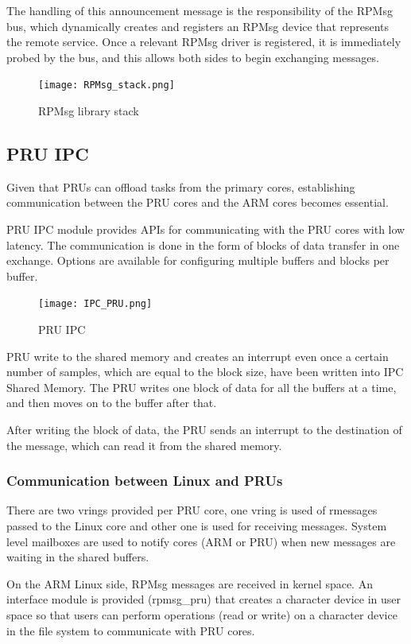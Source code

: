 The handling of this announcement message is the responsibility of the
RPMsg bus, which dynamically creates and registers an RPMsg device that
represents the remote service. Once a relevant RPMsg driver is registered, it
is immediately probed by the bus, and this allows both sides to begin
exchanging messages.

\begin{figure}[ht]
    \centering
    \texttt{[image: RPMsg\_stack.png]}
    \caption{RPMsg library stack}
\end{figure}

\subsection{PRU IPC}

Given that PRUs can offload tasks from the primary cores, establishing 
communication between the PRU cores and the ARM cores becomes essential.

PRU IPC module provides APIs for communicating with the PRU cores with low
latency. The communication is done in the form of blocks of data transfer in
one exchange. Options are available for configuring multiple buffers and blocks
per buffer.

\begin{figure}[ht]
    \centering
    \texttt{[image: IPC\_PRU.png]}
    \caption{PRU IPC}
\end{figure}

PRU write to the shared memory and creates an interrupt even once a certain
number of samples, which are equal to the block size, have been written into
IPC Shared Memory.
The PRU writes one block of data for all the buffers at a time, and then moves
on to the buffer after that.

After writing the block of data, the PRU sends an interrupt to the destination
of the message, which can read it from the shared memory.

\subsubsection{Communication between Linux and PRUs}

There are two vrings provided per PRU core, one vring is used of rmessages
passed to the Linux core and other one is used for receiving messages.
System level mailboxes are used to notify cores (ARM or PRU) when new messages
are waiting in the shared buffers.

On the ARM Linux side, RPMsg messages are received in kernel space.
An interface module is provided (rpmsg\_pru) that creates a character device in
user space so that users can perform operations (read or write) on a character
device in the file system to communicate with PRU cores.

